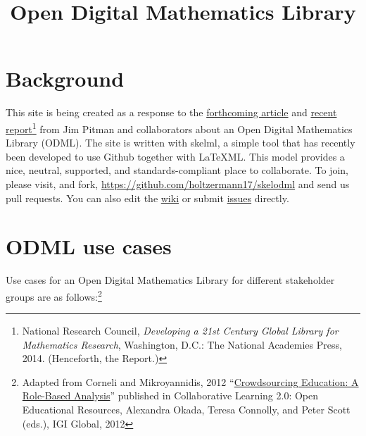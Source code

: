 \documentclass{article}
\begin{document}
\title{Open Digital Mathematics Library}

\maketitle

\section{Background}

This site is being created as a response to the  \href{http://www.mathunion.org/fileadmin/CEIC/planning_wdml.pdf}{forthcoming article} and
 \href{http://arxiv.org/abs/1404.1905}{recent report}\footnote{National Research Council, \emph{Developing a 21st Century Global Library for Mathematics Research}, Washington, D.C.: The National Academies Press, 2014.  (Henceforth, the Report.)} from Jim Pitman and collaborators about an Open Digital Mathematics Library (ODML).
%
The site is written with skelml, a simple tool that has recently been developed to use Github together with \LaTeX ML.  This model provides a nice, neutral, supported, and standards-compliant place to collaborate.  To join, please visit, and fork, \url{https://github.com/holtzermann17/skelodml} and send us pull requests.  You can also edit the \href{https://github.com/holtzermann17/skelodml/wiki}{wiki} or
submit \href{https://github.com/holtzermann17/skelodml/issues}{issues} directly.

\section{ODML use cases}

Use cases for an Open Digital Mathematics Library for different stakeholder groups are as follows:\footnote{Adapted from Corneli and Mikroyannidis, 2012 ``\href{http://oro.open.ac.uk/33221/1/corneli_chap_okada_book.pdf}{Crowdsourcing Education: A Role-Based Analysis}'' published in
Collaborative Learning 2.0: Open Educational Resources,
Alexandra Okada, Teresa Connolly, and Peter Scott (eds.), IGI Global, 2012}
\end{document}
